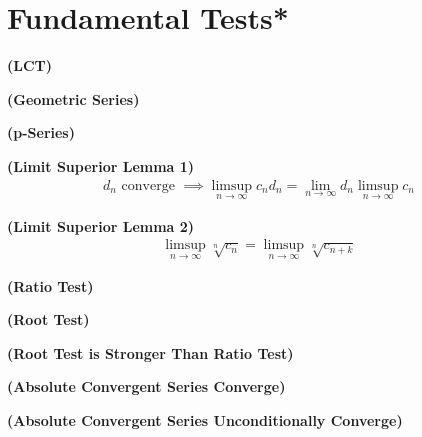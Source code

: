 \documentclass{report}
\begin{document}
\section{Fundamental Tests*}
\begin{theorem}
\textbf{(LCT)}
\end{theorem}
\begin{mdframed}

\end{mdframed}
\begin{theorem}
\textbf{(Geometric Series)}
\end{theorem}
\begin{theorem}
\textbf{(p-Series)}
\end{theorem}
\begin{mdframed}

\end{mdframed}
\begin{theorem}
\textbf{(Limit Superior Lemma 1)} 
\begin{align*}
d_n \text{ converge }\implies \limsup_{n\to\infty} c_nd_n=\lim_{n\to \infty}d_n\limsup_{n\to\infty} c_n
\end{align*}
\end{theorem}
\begin{theorem}
\textbf{(Limit Superior Lemma 2)} 
\begin{align*}
\limsup_{n\to\infty} \sqrt[n]{c_n} =\limsup_{n\to\infty} \sqrt[n]{c_{n+k}} 
\end{align*}
\end{theorem}
\begin{mdframed}

\end{mdframed}
\begin{theorem}
\textbf{(Ratio Test)}
\end{theorem}
\begin{theorem}
\textbf{(Root Test)}
\end{theorem}
\begin{theorem}
\textbf{(Root Test is Stronger Than Ratio Test)}
\end{theorem}
\begin{mdframed}

\end{mdframed}
\begin{theorem}
\textbf{(Absolute Convergent Series Converge)}
\end{theorem}
\begin{theorem}
\textbf{(Absolute Convergent Series Unconditionally Converge)}
\end{theorem}
\end{document}
